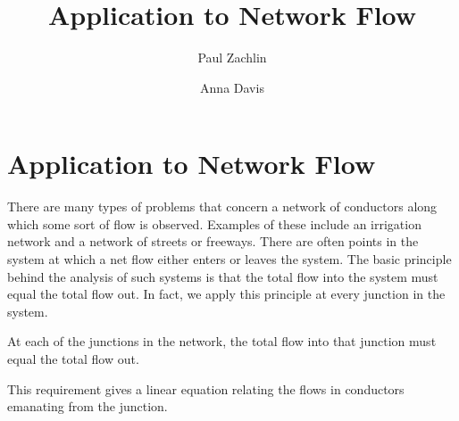\documentclass{ximera}
\author{Paul Zachlin \and Anna Davis} \title{Application to Network Flow} \license{CC-BY 4.0}
\begin{document}
\begin{abstract}
\end{abstract}
\maketitle

\section*{Application to Network Flow}
There are many types of problems that concern a network of conductors along which some sort of flow is observed. Examples of these include an irrigation network and a network of streets or freeways. There are often points in the system at which a net flow either enters or leaves the system. The basic principle behind the analysis of such systems is that the total flow into the system must equal the total flow out. In fact, we apply this principle at every junction in the system.

\begin{theorem}\label{001735}
At each of the junctions in the network, the total flow into that junction must equal the total flow out.
\end{theorem}

\noindent This requirement gives a linear equation relating the flows in conductors emanating from the junction.
\end{document}
